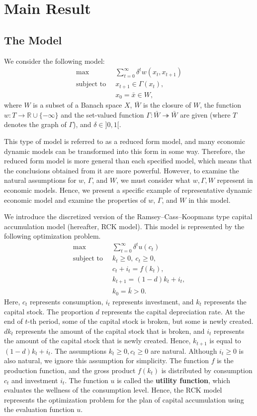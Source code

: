 \documentclass[a4paper,12pt]{article}
\theoremstyle{definition}
\begin{document}
\section{Main Result}
\subsection{The Model}
We consider the following model:
\begin{align}
\max~~~~~&~\sum_{t=0}^{\infty}\delta^tw(x_t,x_{t+1})\nonumber \\
\mbox{subject to }&~x_{t+1}\in \Gamma(x_t),\label{RF}\\
&~x_0=\bar{x}\in W,\nonumber
\end{align}
where $W$ is a subset of a Banach space $X$, $\bar{W}$ is the closure of $W$, the function $w:T\to \mathbb{R}\cup\{-\infty\}$ and the set-valued function $\Gamma:\bar{W}\twoheadrightarrow \bar{W}$ are given (where $T$ denotes the graph of $\Gamma$), and $\delta\in ]0,1[$.

This type of model is referred to as a reduced form model, and many economic dynamic models can be transformed into this form in some way. Therefore, the reduced form model is more general than each specified model, which means that the conclusions obtained from it are more powerful. However, to examine the natural assumptions for $w$, $\Gamma$, and $W$, we must consider what $w, \Gamma, W$ represent in economic models. Hence, we present a specific example of representative dynamic economic model and examine the properties of $w$, $\Gamma$, and $W$ in this model.

We introduce the discretized version of the Ramsey--Cass--Koopmans type capital accumulation model (hereafter, RCK model). This model is represented by the following optimization problem. 
\begin{align}
\max~~~~~&~\sum_{t=0}^{\infty}\delta^tu(c_t)\nonumber \\
\mbox{subject to }&~k_t\ge 0,\ c_t\ge 0,\nonumber \\
&~c_t+i_t=f(k_t),\label{RCK}\\
&~k_{t+1}=(1-d)k_t+i_t,\nonumber \\
&~k_0=\bar{k}>0.\nonumber
\end{align}
Here, $c_t$ represents consumption, $i_t$ represents investment, and $k_t$ represents the capital stock. The proportion $d$ represents the capital depreciation rate. At the end of $t$-th period, some of the capital stock is broken, but some is newly created. $dk_t$ represents the amount of the capital stock that is broken, and $i_t$ represents the amount of the capital stock that is newly created. Hence, $k_{t+1}$ is equal to $(1-d)k_t+i_t$. The assumptions $k_t\ge 0,c_t\ge 0$ are natural. Although $i_t\ge 0$ is also natural, we ignore this assumption for simplicity. The function $f$ is the production function, and the gross product $f(k_t)$ is distributed by consumption $c_t$ and investment $i_t$. The function $u$ is called the {\bf utility function}, which evaluates the wellness of the consumption level. Hence, the RCK model represents the optimization problem for the plan of capital accumulation using the evaluation function $u$.
\end{document}
